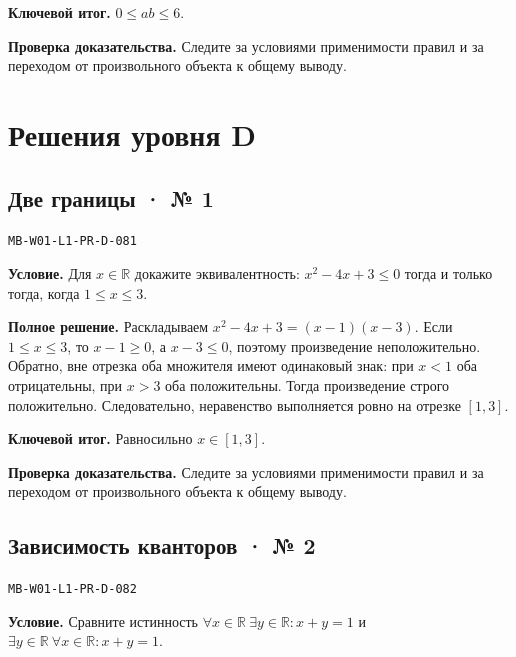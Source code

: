 \documentclass[11pt,a4paper,openany]{book}
\newcommand{\muid}[1]{\texttt{\footnotesize #1}}
\begin{document}
\begin{learnbox}\textbf{Ключевой итог.} $0\le ab\le6$.\par \textbf{Проверка доказательства.} 
Следите за условиями применимости правил и за переходом от произвольного объекта к общему выводу. 
\end{learnbox}

\section{Решения уровня D}

\subsection*{Две границы · № 1}\hypertarget{solution:MB-W01-L1-PR-D-081}{}

\muid{MB-W01-L1-PR-D-081}\par

\textbf{Условие.} Для $x\in\mathbb R$ докажите эквивалентность: $x^2-4x+3\le0$ тогда и только тогда, когда $1\le x\le3$.\par

\textbf{Полное решение.} Раскладываем $x^2-4x+3=(x-1)(x-3)$. Если $1\le x\le3$, то $x-1\ge0$, а $x-3\le0$, поэтому произведение неположительно. Обратно, вне отрезка оба множителя имеют одинаковый знак: при $x<1$ оба отрицательны, при $x>3$ оба положительны. Тогда произведение строго положительно. Следовательно, неравенство выполняется ровно на отрезке $[1,3]$.


\begin{learnbox}\textbf{Ключевой итог.} Равносильно $x\in[1,3]$.\par \textbf{Проверка доказательства.} 
Следите за условиями применимости правил и за переходом от произвольного объекта к общему выводу. 
\end{learnbox}

\subsection*{Зависимость кванторов · № 2}\hypertarget{solution:MB-W01-L1-PR-D-082}{}

\muid{MB-W01-L1-PR-D-082}\par

\textbf{Условие.} Сравните истинность $\forall x\in\mathbb R\ \exists y\in\mathbb R\colon x+y=1$ и $\exists y\in\mathbb R\ \forall x\in\mathbb R\colon x+y=1$.\par
\end{document}
